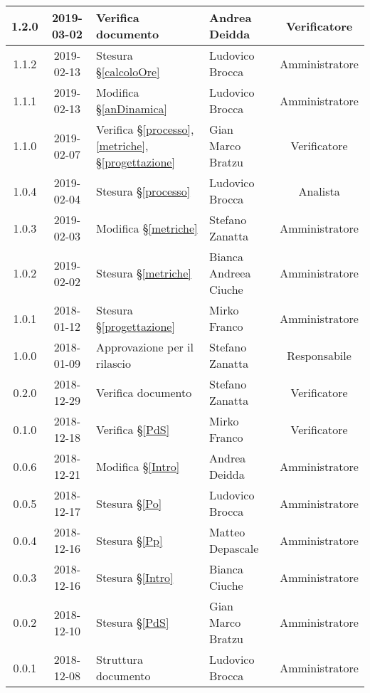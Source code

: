 \begin{center}
\begin{tabularx}{\textwidth}{|c|c|X|X|c|}
			\hline
			1.2.0 &2019-03-02 & Verifica documento &Andrea Deidda& Verificatore\\
			\hline
			1.1.2 &2019-02-13 &Stesura \S\ref{calcoloOre} &Ludovico Brocca& Amministratore\\
			\hline
			1.1.1 &2019-02-13 &Modifica \S\ref{anDinamica} &Ludovico Brocca& Amministratore\\
			\hline
			1.1.0 &2019-02-07 &Verifica \S\ref{processo}, \ref{metriche}, \S\ref{progettazione} &Gian Marco Bratzu& Verificatore\\
			\hline
			1.0.4 &2019-02-04&Stesura \S\ref{processo}&Ludovico Brocca& Analista\\
			\hline
			1.0.3 & 2019-02-03 & Modifica \S\ref{metriche} & Stefano Zanatta & Amministratore\\
			\hline
			1.0.2 & 2019-02-02 & Stesura \S\ref{metriche} & Bianca Andreea Ciuche & Amministratore\\
			\hline
			1.0.1 & 2018-01-12 & Stesura \S\ref{progettazione} & Mirko Franco & Amministratore \\
			\hline
			1.0.0 & 2018-01-09 & Approvazione per il rilascio & Stefano Zanatta & Responsabile\\
			\hline
			0.2.0 & 2018-12-29 & Verifica documento & Stefano Zanatta & Verificatore\\
			\hline
			0.1.0 & 2018-12-18 & Verifica \S\ref{PdS} & Mirko Franco & Verificatore\\
			\hline
			0.0.6 & 2018-12-21 & Modifica \S\ref{Intro} & Andrea Deidda & Amministratore\\
			\hline
			0.0.5 & 2018-12-17 & Stesura \S\ref{Po} & Ludovico Brocca & Amministratore\\
			\hline
			0.0.4 & 2018-12-16 & Stesura \S\ref{Pp} & Matteo Depascale & Amministratore\\
			\hline
			0.0.3 & 2018-12-16 & Stesura \S\ref{Intro} & Bianca Ciuche & Amministratore\\
			\hline
			0.0.2 & 2018-12-10 & Stesura \S\ref{PdS} & Gian Marco Bratzu & Amministratore\\	
			\hline
			0.0.1 & 2018-12-08 & Struttura documento  & Ludovico Brocca & Amministratore\\
			\hline
	\end{tabularx}
	\end{center}

\newpage